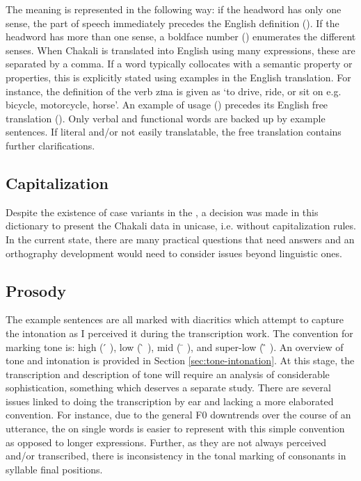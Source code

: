 The meaning  is represented in the following way: if the headword has only one sense,  the part of speech immediately precedes the English definition ().  If the headword has more than one sense,  a boldface number () enumerates the different senses. When Chakali is translated into English using many expressions, these are separated by a comma. If a word typically collocates with a semantic property or properties, this is explicitly stated using examples in the English translation.  For instance, the definition of the verb {\sls zɪna} is given  as   `to drive, ride, or sit on e.g. bicycle, motorcycle, horse'.  An example of usage () precedes its English free translation (). Only verbal and functional words  are backed up by example sentences.  If literal and/or not easily translatable, the free translation contains further clarifications.


\subsection{Capitalization}
\label{sec:capitalization}

Despite the existence of case variants in the , a decision was made in this dictionary to present the Chakali data in unicase, i.e. without capitalization rules.  In the current state, there are many practical questions that need answers and an orthography development would need to consider issues beyond linguistic ones.

\subsection{Prosody}
\label{sec:INT-prosody}

The example sentences are all marked with diacritics which attempt to capture the intonation as I perceived it during the transcription work. The convention for marking tone is:  high (    ́   ), low (    ̀  ), mid   (  ̄  ),  and super-low ( ̏  ).   An overview of tone and intonation is provided in Section \ref{sec:tone-intonation}. At this stage, the transcription and description of tone will require an analysis of considerable sophistication, something which deserves a separate study. There are several issues linked to doing the transcription by ear and lacking a more elaborated convention. For instance, due to the general F0 downtrends over the course of an utterance,  the  on single words is easier to represent with this simple convention as opposed  to longer expressions. Further, as they are  not always perceived and/or transcribed, there is inconsistency in the tonal marking of consonants in syllable final positions.


